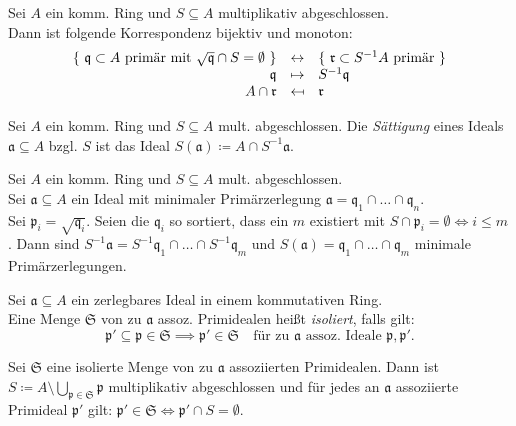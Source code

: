 \documentclass{cheat-sheet}
\newcommand{\aaa}{\mathfrak{a}}
\newcommand{\ppp}{\mathfrak{p}}
\newcommand{\qqq}{\mathfrak{q}}
\newcommand{\rrr}{\mathfrak{r}}
\begin{document}
\begin{kor}
  Sei $A$ ein komm. Ring und $S \subseteq A$ multiplikativ abgeschlossen. \\
  Dann ist folgende Korrespondenz bijektiv und monoton:
  \[
    \begin{array}{r c l}
      \{ \text{ $\qqq \subset A$ primär mit $\sqrt{\qqq} \cap S = \emptyset$ } \} & \leftrightarrow & \{ \text{ $\rrr \subset S^{-1} A$ primär } \} \\
      \qqq & \mapsto & S^{-1} \qqq \\
      A \cap \rrr & \mapsfrom & \rrr
    \end{array}
  \]
\end{kor}


\begin{defn}
  Sei $A$ ein komm. Ring und $S \subseteq A$ mult. abgeschlossen.
  Die \emph{Sättigung} eines Ideals $\aaa \subseteq A$ bzgl. $S$ ist das Ideal $S(\aaa) \coloneqq A \cap S^{-1} \aaa$.
\end{defn}

\begin{prop}
  Sei $A$ ein komm. Ring und $S \subseteq A$ mult. abgeschlossen. \\
  Sei $\aaa \subseteq A$ ein Ideal mit minimaler Primärzerlegung $\aaa = \qqq_1 \cap \ldots \cap \qqq_n$. \\
  Sei $\ppp_i = \sqrt{\qqq_i}$.
  Seien die $\qqq_i$ so sortiert, dass ein $m$ existiert mit $S \cap \ppp_i = \emptyset \iff i \leq m$.
  Dann sind $S^{-1} \aaa = S^{-1} \qqq_1 \cap \ldots \cap S^{-1} \qqq_m$ und $S(\aaa) = \qqq_1 \cap \ldots \cap \qqq_m$ minimale Primärzerlegungen.
\end{prop}

\begin{defn}
  Sei $\aaa \subseteq A$ ein zerlegbares Ideal in einem kommutativen Ring. \\
  Eine Menge $\mathfrak{S}$ von zu $\aaa$ assoz. Primidealen heißt \emph{isoliert}, falls gilt:
  \[
    \ppp' \subseteq \ppp \in \mathfrak{S} \implies \ppp' \in \mathfrak{S}
    \quad \text{für zu $\aaa$ assoz. Ideale $\ppp, \ppp'$.}
  \]
\end{defn}

\begin{prop}
  Sei $\mathfrak{S}$ eine isolierte Menge von zu $\aaa$ assoziierten Primidealen.
  Dann ist $S \coloneqq A \setminus \bigcup_{\ppp \in \mathfrak{S}} \ppp$ multiplikativ abgeschlossen und für jedes an $\aaa$ assoziierte Primideal $\ppp'$ gilt: $\ppp' \in \mathfrak{S} \iff \ppp' \cap S = \emptyset$.
\end{prop}
\end{document}
